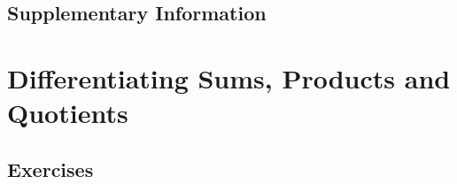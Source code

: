 \documentclass{fts_m2}
\begin{document}
    \subsection*{Supplementary Information}
    

    \section{Differentiating Sums, Products and Quotients}
    
    \subsection*{Exercises}
    

\end{document}
